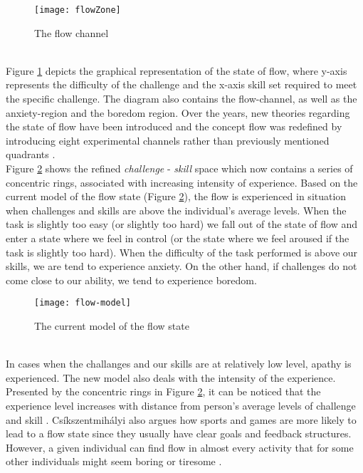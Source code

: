 \begin{figure}[h]
    \centering
    \texttt{[image: flowZone]}
    \caption{The flow channel \cite{csikszentmihalyi1996flow}}
    \label{fig:flowZone}
\end{figure}\\
Figure \ref{fig:flowZone} depicts the graphical representation of the state of flow, where y-axis represents the difficulty of the challenge and the x-axis skill set required to meet the specific challenge. The diagram also contains the flow-channel, as well as the anxiety-region and the boredom region. Over the years, new theories regarding the state of flow have been introduced and the concept flow was redefined by introducing eight experimental channels rather than previously mentioned quadrants \cite{nakamura2014concept}. \\Figure \ref{fig:flowModel} shows the refined \textit{challenge} - \textit{skill} space which now contains a series of concentric rings, associated with increasing intensity of experience. Based on the current model of the flow state (Figure \ref{fig:flowModel}), the flow is experienced in situation when challenges and skills are above the individual's average levels. When the task is slightly too easy (or slightly too hard) we fall out of the state of flow and enter a state where we feel in control (or the state where we feel aroused if the task is slightly too hard). When the difficulty of the task performed is above our skills, we are tend to experience anxiety. On the other hand, if challenges do not come close to our ability, we tend to experience boredom. \\
\begin{figure}[h]
    \centering
    \texttt{[image: flow-model]}
    \caption{The current model of the flow state \cite{nakamura2014concept}}
    \label{fig:flowModel}
\end{figure}\\
In cases when the challanges and our skills are at relatively low level, apathy is experienced. The new model also deals with the intensity of the experience. Presented by the concentric rings in Figure \ref{fig:flowModel}, it can be noticed that the experience level increases with distance from person's average levels of challenge and skill \cite{nakamura2014concept}. Cs\'{i}kszentmih\'{a}lyi also argues how sports and games are more likely to lead to a flow state since they usually have clear goals and feedback structures. However, a given individual can find flow in almost every activity that for some other individuals might seem boring or tiresome \cite{csikszentmihalyi2014flow}.

